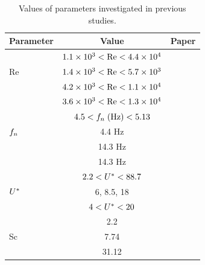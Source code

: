 \documentclass[oneside]{utmthesis}
\begin{document}
\begin{table}[!ht]
\centering
\caption{Values of parameters investigated in previous studies.} \label{tab:parameterRange}
\vspace{\baselineskip}
\setlength{\tabcolsep}{10pt}      %
\renewcommand{\arraystretch}{1.5} %
\begin{tabular}{l c l}
  \hline
  \hline
Parameter                & Value                                         & Paper              \\ \hline
\multirow{3}{*}{Re}      & $1.1 \times 10^{3} < \text{Re} < 4.4 \times 10^{4}$ & \citet{Koide2013}  \\
                         & $1.4 \times 10^{3} < \text{Re} < 5.7 \times 10^{3}$ & \citet{Koide2017}  \\
                         & $4.2 \times 10^{3} < \text{Re} < 1.1 \times 10^{4}$ & \citet{Maruai2018} \\
                         & $3.6 \times 10^{3} < \text{Re} < 1.3 \times 10^{4}$ & \citet{Maruai2019} \\ \hline
\multirow{3}{*}{$f_{n}$}   & $4.5 < f_{n} \; (\text{Hz}) < 5.13$             & \citet{Nguyen2012} \\
                         & 4.4 Hz                                        & \citet{Koide2013}  \\
                         & 14.3 Hz                                       & \citet{Maruai2018} \\
                         & 14.3 Hz                                       & \citet{Maruai2019} \\ \hline
\multirow{3}{*}{$U^{*}$} & $2.2 < U^{*} < 88.7$                          & \citet{Koide2013}  \\
                         & 6, 8.5, 18                                    & \citet{Maruai2018} \\
                         & $4 < U^{*} < 20$                              & \citet{Maruai2019} \\ \hline
\multirow{3}{*}{Sc}      & 2.2                                           & \citet{Nguyen2012} \\
                         & 7.74                                          & \citet{Koide2013}  \\
                         & 31.12                                         & \citet{Maruai2019} \\
  \hline
  \hline
\end{tabular}
\end{table}
\end{document}
